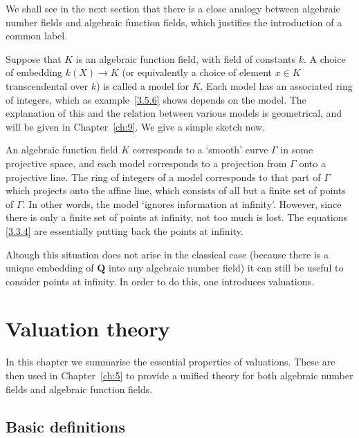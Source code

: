 \documentclass[10pt,leqno]{article}
\theoremstyle{definition}
\def\QQ{\mathbf{Q}}
\def\qw#1{`#1'}
\begin{document}
We shall see in the next section that there is a close analogy between algebraic number fields and algebraic function fields, which justifies the introduction of a common label.

Suppose that $K$ is an algebraic function field, with field of constants $k$.
A choice of embedding $k(X) \to K$ (or equivalently a choice of element $x \in K$ transcendental over $k$) is called a model for $K$.
Each model has an associated ring of integers, which as example~\ref{3.5.6} shows depends on the model.
The explanation of this and the relation between various models is geometrical, and will be given in Chapter~\ref{ch:9}.
We give a simple sketch now.

\begin{figure}[h]
\end{figure}

An algebraic function field $K$ corresponds to a \qw{smooth} curve $\Gamma$ in some projective space, and each model corresponds to a projection from $\Gamma$ onto a projective line.
The ring of integers of a model corresponds to that part of $\Gamma$ which projects onto the affine line, which consists of all but a finite set of points of $\Gamma$.
In other words, the model \qw{ignores information at infinity}.
However, since there is only a finite set of points at infinity, not too much is lost.
The equations \eqref{3.3.4} are essentially putting back the points at infinity.

Altough this situation does not arise in the classical case (because there is a unique embedding of $\QQ$ into any algebraic number field) it can still be useful to consider points at infinity.
In order to do this, one introduces valuations.



\section{Valuation theory}
\label{ch:4}


In this chapter we summarise the essential properties of valuations.
These are then used in Chapter~\ref{ch:5} to provide a unified theory for both algebraic number fields and algebraic function fields.


\subsection{Basic definitions}
\label{ch:4.1}
\end{document}
